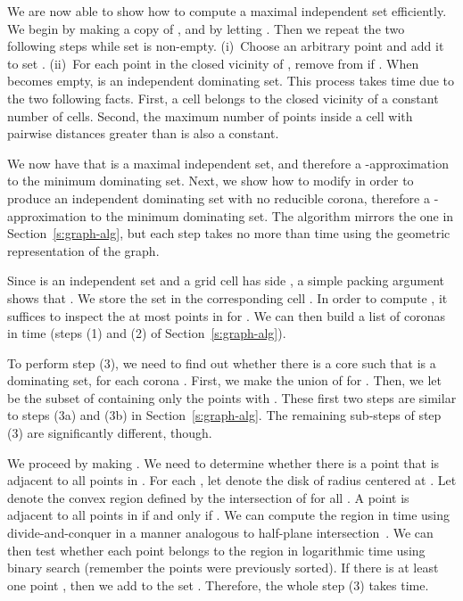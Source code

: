 \documentclass[preprint,12pt]{elsarticle}
\begin{document}
We are now able to show how to compute a maximal independent set  efficiently. We begin by making a copy  of , and by letting . Then we repeat the two following steps while set  is non-empty. (i)~Choose an arbitrary point  and add it to set . (ii)~For each point  in the closed vicinity of , remove  from  if . When  becomes empty,  is an independent dominating set.
This process takes  time due to the two following facts. First, a cell belongs to the closed vicinity of a constant number of cells. Second, the maximum number of points inside a cell with pairwise distances greater than  is also a constant.

We now have that  is a maximal independent set, and therefore \linebreak a -approximation to the minimum dominating set. Next, we show how to modify  in order to produce an independent dominating set with no reducible corona, therefore a -approximation to the minimum dominating set. The algorithm mirrors the one in Section~\ref{s:graph-alg}, but each step takes no more than   time using the geometric representation of the graph.

Since  is an independent set and a grid cell  has side , a simple packing argument shows that . We store the set  in the corresponding cell . In order to compute , it suffices to inspect the at most  points in  for . We can then build a list of coronas in  time (steps (1) and (2) of Section~\ref{s:graph-alg}).

To perform step (3), we need to find out whether there is a core  such that  is a dominating set, for each corona . First, we make  the union of  for . Then, we let  be the subset of  containing only the points  with . These first two steps are similar to steps (3a) and (3b) in Section~\ref{s:graph-alg}. The remaining sub-steps of step (3) are significantly different, though.

We proceed by making . We need to determine whether there is a point  that is adjacent to all points in . For each , let  denote the disk of radius  centered at . Let  denote the convex region defined by the intersection of  for all . A point  is adjacent to all points in  if and only if . We can compute the region  in  time using divide-and-conquer in a manner analogous to half-plane intersection~\cite{cg}. We can then test whether each point  belongs to the region  in logarithmic time using binary search (remember the points were previously sorted). If there is at least one point , then we add  to the set . Therefore, the whole step (3) takes  time.
\end{document}
